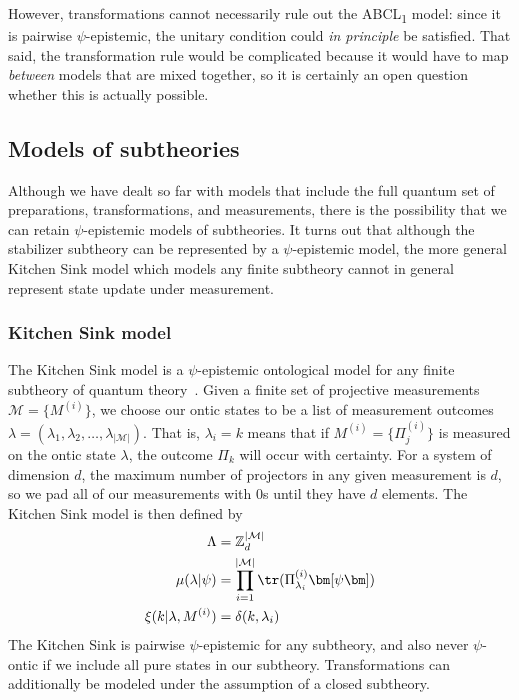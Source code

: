 \documentclass[%
 reprint,
superscriptaddress,
nofootinbib,
 amsmath,amssymb,
 prx, 
 accepted=2019-09-27,
]{quantumarticle}
\newcommand{\Z}{\mathbb{Z}}
\newcommand{\M}{\mathcal{M}}
\newcommand{\m}{{\left| \mathcal M \right |}}
\newcommand{\abclo}{{ABCL\textsubscript{1}} }
\newcommand{\proj}[1]{{\bm[}#1{\bm]}}
\begin{document}
However, transformations cannot necessarily rule out the \abclo model:
since it is pairwise $\psi$-epistemic, the unitary condition could
\emph{in principle} be satisfied. That said, the transformation rule
would be complicated because it would have to map \emph{between}
models that are mixed together, so it is certainly an open question
whether this is actually possible.


\subsection{Models of subtheories}
Although we have dealt so far with models that include the full
quantum set of preparations, transformations, and measurements, there
is the possibility that we can retain $\psi$-epistemic models of
subtheories. It turns out that although the stabilizer subtheory can
be represented by a $\psi$-epistemic model, the more general Kitchen
Sink model which models any finite subtheory cannot in general
represent state update under measurement.

\subsubsection{Kitchen Sink model}
\label{sec:kitchen-sink-model}
The Kitchen Sink model is a $\psi$-epistemic ontological model for any
finite subtheory of quantum
theory~\mbox{\cite[Section~IIIC]{HarriganRepresentingprobabilisticdata2007}}. Given
a finite set of projective measurements $\M=\{M^{(i)}\}$, we choose
our ontic states to be a list of measurement outcomes
$\lambda=(\lambda_1,\lambda_2,\ldots,\lambda_\m)$. That is,
$\lambda_i=k$ means that if $M^{(i)}=\{\Pi^{(i)}_j\}$ is measured on
the ontic state $\lambda$, the outcome $\Pi_k$ will occur with
certainty.  For a system of dimension $d$, the maximum number of
projectors in any given measurement is $d$, so we pad all of our
measurements with $0$s until they have $d$ elements. The Kitchen Sink
model is then defined by
\begin{align}
  \Lambda            & = \Z_d^\m\nonumber\\
  \mu(\lambda|\psi)  & =\prod_{i=1}^\m\tr(\Pi^{(i)}_{\lambda_i}\proj\psi) \nonumber\\
  \xi(k|\lambda,M^{(i)}) & = \delta(k,\lambda_i)                 
\end{align}
The Kitchen Sink is pairwise $\psi$-epistemic for any subtheory, and
also never $\psi$-ontic if we include all pure states in our
subtheory. Transformations can additionally be modeled under the
assumption of a closed subtheory. 
\end{document}
